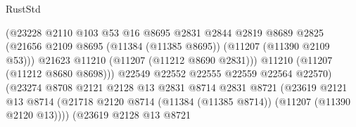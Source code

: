 \begin{lexlean}{RustStd}
\begin{coremodule}
                                            (@23228
                                              @2110
                                              @103
                                              @53
                                              @16
                                              @8695
                                              @2831
                                              @2844
                                              @2819
                                              @8689
                                              @2825
                                              (@21656
                                                @2109
                                                @8695
                                                (@11384 (@11385 @8695))
                                                (@11207 (@11390 @2109 @53)))
                                              @21623
                                              @11210
                                              (@11207 (@11212 @8690 @2831)))
                                            @11210
                                            (@11207 (@11212 @8680 @8698)))
                                          @22549
                                          @22552
                                          @22555
                                          @22559
                                          @22564
                                          @22570)
                                        (@23274
                                          @8708
                                          @2121
                                          @2128
                                          @13
                                          @2831
                                          @8714
                                          @2831
                                          @8721
                                          (@23619
                                            @2121
                                            @13
                                            @8714
                                            (@21718
                                              @2120
                                              @8714
                                              (@11384 (@11385 @8714))
                                              (@11207 (@11390 @2120 @13))))
                                          (@23619
                                            @2128
                                            @13
                                            @8721

\end{coremodule}
\end{lexlean}

